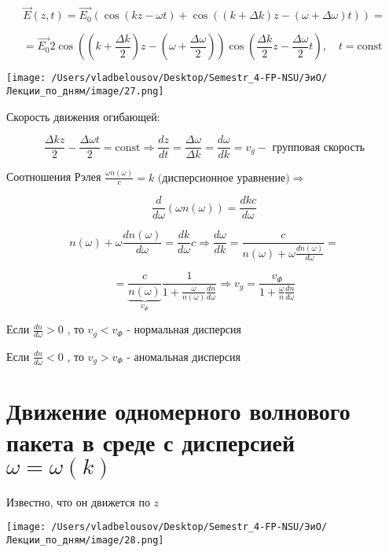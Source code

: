 \documentclass[12pt, a4paper]{report}
\begin{document}
\[ \vec{E }  (z, t ) = \vec{E_0 }(\cos (kz - \omega t )+ \cos  ( (k+ \Delta k)z - ( \omega +\Delta \omega )t))=\]

\[ = \vec{E_0 } 2 \cos \left( \left( k+ \frac{\Delta k}{2}  \right)z - \left( \omega + \frac{\Delta \omega}{2}  \right) \right) \cos \left(  \frac{\Delta k }{2} z - \frac{\Delta \omega }{2 }  t   \right), \quad t=\text{const }     \] 

\begin{center}
    \texttt{[image: /Users/vladbelousov/Desktop/Semestr\_4-FP-NSU/ЭиО/Лекции\_по\_дням/image/27.png]}
\end{center}

Скорость движения огибающей: 

\[ \frac{\Delta k z }{ 2 }  - \frac{\Delta \omega t }{2 }  = \mathrm{const }  \Rightarrow \frac{dz}{dt } = \frac{ \Delta \omega }{\Delta k } = \boxed {\frac{d \omega }{ dk }  = v_{g}} - \text{ групповая скорость}     \] 

Соотношения Рэлея \( \displaystyle \frac{\omega n( \omega)}{c }  = k \text{ (дисперсионное уравнение)} \Rightarrow   \) 

\[ \frac{d}{d \omega} ( \omega n ( \omega)) = \frac{ dk c }{d \omega } \] 

\[  n(\omega ) + \omega \frac{dn( \omega )}{d \omega } = \frac{dk}{d \omega } c \Rightarrow   \frac{d \omega } {dk } = \frac{ c }{ n( \omega ) + \omega \frac{ dn (\omega)}{d \omega} }  =       \] 

\[ =\underbrace{ \frac{c}{ n ( \omega )}}_{v_{\Phi } } \frac{1}{ 1+ \frac{\omega}{n ( \omega )}\frac{dn}{d \omega}  }  \Rightarrow v_g = \frac{v_{\Phi} } {1+ \frac{\omega}{ n } \frac{dn}{d \omega}  }   \] 

Если \( \displaystyle  \frac{dn}{d \omega }> 0   \) , то \( v_g< v_{\Phi}  \) - нормальная дисперсия

Если  \( \displaystyle  \frac{dn}{d \omega }< 0   \) , то \( v_g>v_{\Phi}  \) - аномальная дисперсия

\section{Движение одномерного волнового пакета в среде с дисперсией \( \omega = \omega( k ) \) }

Известно, что он движется по \( z \) 

\begin{center}
    \texttt{[image: /Users/vladbelousov/Desktop/Semestr\_4-FP-NSU/ЭиО/Лекции\_по\_дням/image/28.png]}
\end{center}
\end{document}
